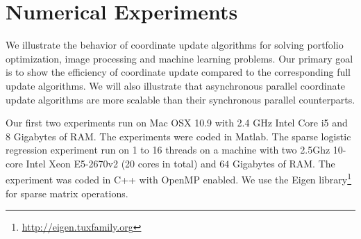 \section{Numerical Experiments}\label{sec:numerical}
We illustrate the behavior of coordinate update algorithms for solving portfolio optimization, image processing and machine learning problems. Our primary goal is to show the efficiency of coordinate update compared to the corresponding full update algorithms. We will also illustrate that asynchronous parallel coordinate update algorithms are more scalable than their synchronous parallel counterparts. 

Our first two experiments run on Mac OSX 10.9 with 2.4 GHz Intel Core i5 and 8 Gigabytes of RAM. The experiments were coded in Matlab. The sparse logistic regression experiment run on 1 to 16 threads on a machine with two 2.5Ghz 10-core Intel Xeon E5-2670v2 (20 cores in total) and $64$ Gigabytes of RAM. The experiment was coded in C++ with OpenMP enabled. We use the Eigen library\footnote{\url{http://eigen.tuxfamily.org}} for sparse matrix operations.

